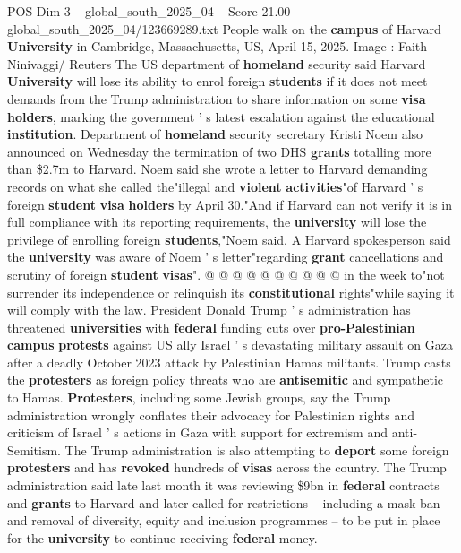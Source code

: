 \begin{textsample}{POS Dim 3 – global\_south\_2025\_04 – Score 21.00 – global\_south\_2025\_04/123669289.txt}  \label{ex:f3_pos_119}
People walk on the \textbf{campus} of Harvard \textbf{University} in Cambridge, Massachusetts, US, April 15, 2025.
Image : Faith Ninivaggi/ Reuters The US department of \textbf{homeland} security said Harvard \textbf{University} will lose its ability to enrol foreign \textbf{students} if it does not meet demands from the Trump administration to share information on some \textbf{visa} \textbf{holders}, marking the government ' s latest escalation against the educational \textbf{institution}.
Department of \textbf{homeland} security secretary Kristi Noem also announced on Wednesday the termination of two DHS \textbf{grants} totalling more than \$2.7m to Harvard.
Noem said she wrote a letter to Harvard demanding records on what she called the"illegal and \textbf{violent} \textbf{activities}"of Harvard ' s foreign \textbf{student} \textbf{visa} \textbf{holders} by April 30."And if Harvard can not verify it is in full compliance with its reporting requirements, the \textbf{university} will lose the privilege of enrolling foreign \textbf{students},"Noem said.
A Harvard spokesperson said the \textbf{university} was aware of Noem ' s letter"regarding \textbf{grant} cancellations and scrutiny of foreign \textbf{student} \textbf{visas}". @ @ @ @ @ @ @ @ @ @ in the week to"not surrender its independence or relinquish its \textbf{constitutional} rights"while saying it will comply with the law.
President Donald Trump ' s administration has threatened \textbf{universities} with \textbf{federal} funding cuts over \textbf{pro-Palestinian} \textbf{campus} \textbf{protests} against US ally Israel ' s devastating military assault on Gaza after a deadly October 2023 attack by Palestinian Hamas militants.
Trump casts the \textbf{protesters} as foreign policy threats who are \textbf{antisemitic} and sympathetic to Hamas. \textbf{Protesters}, including some Jewish groups, say the Trump administration wrongly conflates their advocacy for Palestinian rights and criticism of Israel ' s actions in Gaza with support for extremism and anti-Semitism.
The Trump administration is also attempting to \textbf{deport} some foreign \textbf{protesters} and has \textbf{revoked} hundreds of \textbf{visas} across the country.
The Trump administration said late last month it was reviewing \$9bn in \textbf{federal} contracts and \textbf{grants} to Harvard and later called for restrictions -- including a mask ban and removal of diversity, equity and inclusion programmes -- to be put in place for the \textbf{university} to continue receiving \textbf{federal} money.

\end{textsample}
